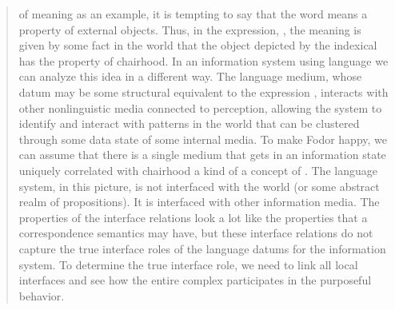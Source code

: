 {\begin{quote}
of meaning as an example, it is tempting to say that
the word  means a property of external objects.
Thus, in the expression, , the meaning
is given by some fact in the world that the object depicted
by the indexical has the property of chairhood.
In an information system using language we can analyze
this idea in a different way. The language medium,
whose datum may be some structural equivalent to the
expression , interacts with other nonlinguistic
media connected to perception, allowing the
system to identify and interact with patterns in the
world that can be clustered through some data state
of some internal media. To make Fodor happy, we can
assume that there is a single medium that gets in an information
state uniquely correlated with chairhood \mdash{}
a kind of a concept of .  The language system, in
this picture, is not interfaced with the world (or some
abstract realm of propositions).  It is interfaced with
other information media. The properties of the interface
relations look a lot like the properties that a correspondence
semantics may have, but these interface relations
do not capture the true interface roles of the language
datums for the information system. To determine the
true interface role, we need to link all local interfaces
and see how the entire complex participates in the purposeful
behavior.  \cite[p. 17]{OrlinVakarelov}
\end{quote}
}
